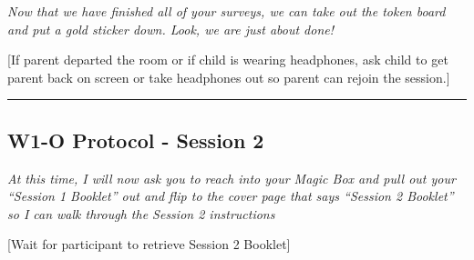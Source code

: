 \documentclass[
]{book}
\begin{document}
\emph{Now that we have finished all of your surveys, we can take out the token board and put a gold sticker down. Look, we are just about done!}

{[}If parent departed the room or if child is wearing headphones, ask child to get parent back on screen or take headphones out so parent can rejoin the session.{]}

\begin{center}\rule{0.5\linewidth}{0.5pt}\end{center}

\hypertarget{w1-o-protocol---session-2}{%
\subsection{W1-O Protocol - Session 2}\label{w1-o-protocol---session-2}}

\emph{At this time, I will now ask you to reach into your Magic Box and pull out your ``Session 1 Booklet'' out and flip to the cover page that says ``Session 2 Booklet'' so I can walk through the Session 2 instructions}

{[}Wait for participant to retrieve Session 2 Booklet{]}
\end{document}
